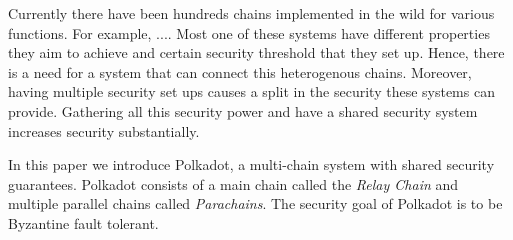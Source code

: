 Currently there have been hundreds chains implemented in the wild for various functions.
For example, ....
Most one of these systems have different properties they aim to achieve and certain security threshold that they set up. Hence, there is a need for a system that can connect this heterogenous chains.
Moreover, having multiple security set ups causes a split in the security these systems can provide.
Gathering all this security power and have a shared security system increases security substantially.

In this paper we introduce Polkadot, a multi-chain system with shared security guarantees.
Polkadot consists of a main chain called the \emph{Relay Chain} and multiple parallel chains called \emph{Parachains}.
The security goal of Polkadot is to be Byzantine fault tolerant.
